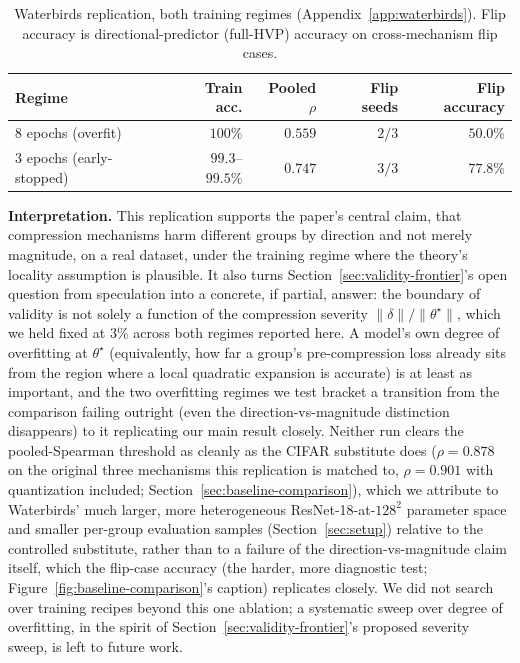 \documentclass{article}
\newcommand{\theorig}{\theta^\star}
\begin{document}
\begin{table}[h]
\centering
\caption{Waterbirds replication, both training regimes (Appendix~\ref{app:waterbirds}). Flip accuracy is directional-predictor (full-HVP) accuracy on cross-mechanism flip cases.}
\label{tab:waterbirds}
\begin{tabular}{@{}lrrrr@{}}
\toprule
Regime & Train acc. & Pooled $\rho$ & Flip seeds & Flip accuracy \\
\midrule
8 epochs (overfit) & $100\%$ & $0.559$ & $2/3$ & $50.0\%$ \\
3 epochs (early-stopped) & $99.3$--$99.5\%$ & $0.747$ & $3/3$ & $77.8\%$ \\
\bottomrule
\end{tabular}
\end{table}

\textbf{Interpretation.} This replication supports the paper's central claim, that compression mechanisms harm different groups by direction and not merely magnitude, on a real dataset, under the training regime where the theory's locality assumption is plausible. It also turns Section~\ref{sec:validity-frontier}'s open question from speculation into a concrete, if partial, answer: the boundary of validity is not solely a function of the compression severity $\|\delta\|/\|\theorig\|$, which we held fixed at $3\%$ across both regimes reported here. A model's own degree of overfitting at $\theorig$ (equivalently, how far a group's pre-compression loss already sits from the region where a local quadratic expansion is accurate) is at least as important, and the two overfitting regimes we test bracket a transition from the comparison failing outright (even the direction-vs-magnitude distinction disappears) to it replicating our main result closely. Neither run clears the pooled-Spearman threshold as cleanly as the CIFAR substitute does ($\rho=0.878$ on the original three mechanisms this replication is matched to, $\rho=0.901$ with quantization included; Section~\ref{sec:baseline-comparison}), which we attribute to Waterbirds' much larger, more heterogeneous ResNet-18-at-$128^2$ parameter space and smaller per-group evaluation samples (Section~\ref{sec:setup}) relative to the controlled substitute, rather than to a failure of the direction-vs-magnitude claim itself, which the flip-case accuracy (the harder, more diagnostic test; Figure~\ref{fig:baseline-comparison}'s caption) replicates closely. We did not search over training recipes beyond this one ablation; a systematic sweep over degree of overfitting, in the spirit of Section~\ref{sec:validity-frontier}'s proposed severity sweep, is left to future work.
\end{document}
